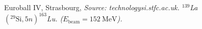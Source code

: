 \documentclass{beamer}
\begin{document}
\begin{frame}
\begin{columns}
\begin{column}{0.4\textwidth}
\begin{figure}
				{\footnotesize Euroball IV, Strasbourg, \textit{Source: technologysi.stfc.ac.uk. $^{139}$La$\left(^{29}\text{Si},5n\right)^{163}$Lu. ($E_\text{beam}=152\ \text{MeV}$).}}
			\end{figure}
		\end{column}
	\end{columns}
\end{frame}



\end{document}
